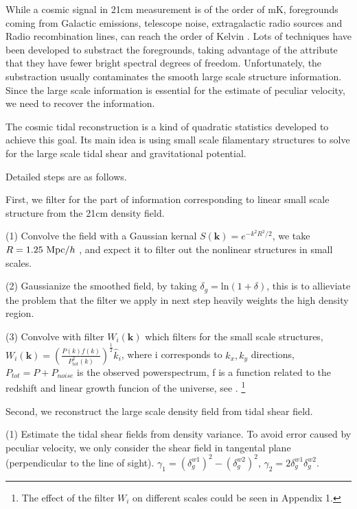 While a cosmic signal in 21cm measurement is of the order of mK,  
foregrounds coming from Galactic emissions, telescope noise, 
extragalactic radio sources and Radio recombination lines, 
can reach the order of Kelvin \cite{DiMatteo04}\cite{Masui13}. 
Lots of techniques have been developed to substract the foregrounds, 
taking advantage of the attribute that they have fewer bright spectral
degrees of freedom\cite{Switzer15}.
Unfortunately, the substraction usually contaminates the smooth large scale structure information.
Since the large scale information is essential for the estimate of
peculiar velocity, we need to recover the information.

The cosmic tidal reconstruction is a kind of quadratic statistics developed to achieve this goal.
Its main idea is using small scale filamentary structures to solve for the large scale tidal shear and gravitational potential.

Detailed steps are as follows.

First, we filter for the part of information corresponding to linear small scale structure from the 21cm density field.

(1) Convolve the field with a Gaussian kernal
$S(\bm{k})=e^{-k^2R^2/2}$, 
we take $R=1.25\ \mathrm{Mpc}/h$ \cite{2012:pen}\cite{2015:zhu},
and expect it to filter out the nonlinear structures in small scales.

(2) Gaussianize the smoothed field, by taking 
$\delta_g=\mathrm{ln}(1+\delta)$, 
this is to allieviate the problem that the filter we apply in next step heavily weights the high density region.

(3) Convolve with filter $W_i(\bm{k})$ which filters for the small scale structures, 
$W_i(\bm{k})=(\frac{P(k)f(k)}{P_{tot}^2(k)})^{\frac{1}{2}}\hat{k}_i$,
where i corresponds to $k_x,k_y$ directions, $P_{tot}=P+P_{noise}$ is the observed powerspectrum, f is a function related to the redshift and linear growth funcion of the universe, see 
\cite{2015:zhu}.
\footnote{The effect of the filter $W_i$ on different scales could be seen in Appendix 1.}

Second, we reconstruct the large scale density field from tidal shear field.

(1) Estimate the tidal shear fields from density variance.
To avoid error caused by peculiar velocity, we only consider the shear field in tangental plane
(perpendicular to the line of sight).
$\gamma_1=(\delta_g^{w1})^2-(\delta_g^{w2})^2$,
$\gamma_2=2\delta_g^{w1}\delta_g^{w2}$.

